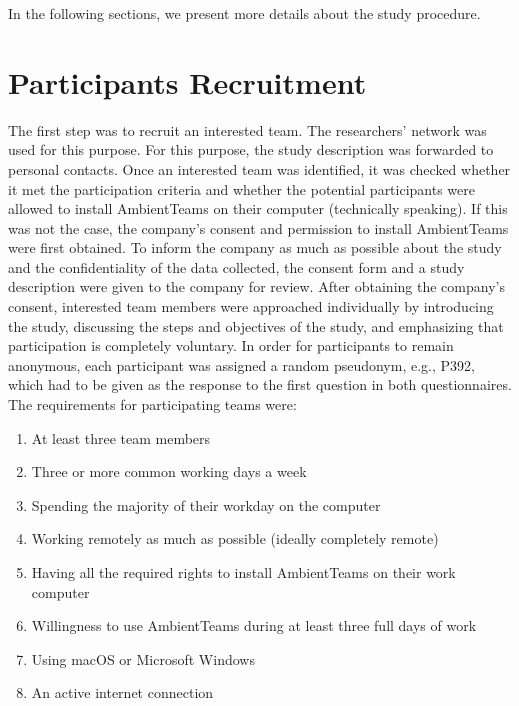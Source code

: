 In the following sections, we present more details about the study procedure.

\section{Participants Recruitment}
\label{section:recruitment}
The first step was to recruit an interested team. The researchers' network was used for this purpose. For this purpose, the study description was forwarded to personal contacts. Once an interested team was identified, it was checked whether it met the participation criteria and whether the potential participants were allowed to install AmbientTeams on their computer (technically speaking). If this was not the case, the company's consent and permission to install AmbientTeams were first obtained. To inform the company as much as possible about the study and the confidentiality of the data collected, the consent form and a study description were given to the company for review. After obtaining the company's consent, interested team members were approached individually by introducing the study, discussing the steps and objectives of the study, and emphasizing that participation is completely voluntary. In order for participants to remain anonymous, each participant was assigned a random pseudonym, e.g., P392, which had to be given as the response to the first question in both questionnaires. The requirements for participating teams were:

\begin{enumerate}
    \item At least three team members
    \item Three or more common working days a week
    \item Spending the majority of their workday on the computer
    \item Working remotely as much as possible (ideally completely remote)
    \item Having all the required rights to install AmbientTeams on their work computer
    \item Willingness to use AmbientTeams during at least three full days of work
    \item Using macOS or Microsoft Windows
    \item An active internet connection
\end{enumerate}

